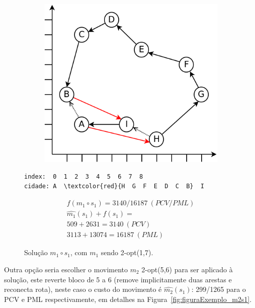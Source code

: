 \begin{figure}[ht]
    \begin{minipage}{.475\textwidth}
        \begin{subfigure}[t]{1\textwidth} %
            \includegraphics[width=1\linewidth]{figuras/pml/exemplo-rodolfo-2opt-1-7.png}
        \end{subfigure}
    \end{minipage}
    \begin{minipage}{.475\textwidth}
\begin{Verbatim}[commandchars=\\\{\}]
index:  0  1  2  3  4  5  6  7  8
cidade: A  \textcolor{red}{H  G  F  E  D  C  B}  I
\end{Verbatim}
\begin{gather*}
f(m_1 \circ s_1) = 3140/16187 \ (PCV/PML) \\ 
\widehat{m_1}(s_1)+f(s_1) = \\ 
509 + 2631 = 3140 \ (PCV)\\
3113 + 13074 = 16187 \ (PML)
\end{gather*}
    \end{minipage}
    \caption{Solução $m_1 \circ s_1$, com $m_1$ sendo 2-opt(1,7).}
    \label{fig:figuraExemplo_m1s1}
\end{figure}

Outra opção seria escolher o movimento $m_2$ 2-opt(5,6) para ser aplicado à solução, este reverte bloco de 5 a 6 (remove implicitamente duas arestas e reconecta rota), neste caso o custo do movimento é $\widehat{m_2}(s_1)$: 299/1265 para o PCV e PML respectivamente, em detalhes na Figura~\ref{fig:figuraExemplo_m2s1}.

